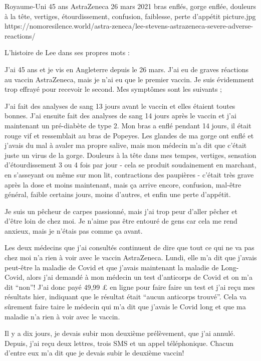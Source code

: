 {Royaume-Uni}
{45 ans}
{AstraZeneca}
{26 mars 2021}
{bras enflés, gorge enflée, douleurs à la tête, vertiges, étourdissement, confusion, faiblesse, perte d'appétit}
{picture.jpg}
{https://nomoresilence.world/astra-zeneca/lee-stevens-astrazeneca-severe-adverse-reactions/}
{

L'histoire de Lee dans ses propres mots :

J'ai 45 ans et je vis en Angleterre depuis le 26 mars. J'ai eu de graves
réactions au vaccin AstraZeneca, mais je n'ai eu que le premier vaccin. Je suis
évidemment trop effrayé pour recevoir le second. Mes symptômes sont les suivants
;

J'ai fait des analyses de sang 13 jours avant le vaccin et elles étaient toutes
bonnes. J'ai ensuite fait des analyses de sang 14 jours après le vaccin et j'ai
maintenant un pré-diabète de type 2. Mon bras a enflé pendant 14 jours, il était
rouge vif et ressemblait au bras de Popeyes. Les glandes de ma gorge ont enflé
et j'avais du mal à avaler ma propre salive, mais mon médecin m'a dit que
c'était juste un virus de la gorge. Douleurs à la tête dans mes tempes,
vertiges, sensation d'étourdissement 3 ou 4 fois par jour - cela se produit
soudainement en marchant, en s'asseyant ou même sur mon lit, contractions des
paupières - c'était très grave après la dose et moins maintenant, mais ça arrive
encore, confusion, mal-être général, faible certains jours, moins d'autres, et
enfin une perte d'appétit.

Je suis un pêcheur de carpes passionné, mais j'ai trop peur d'aller pêcher et
d'être loin de chez moi. Je n'aime pas être entouré de gens car cela me rend
anxieux, mais je n'étais pas comme ça avant.

Les deux médecins que j'ai consultés continuent de dire que tout ce qui ne va
pas chez moi n'a rien à voir avec le vaccin AstraZeneca. Lundi, elle m'a dit que
j'avais peut-être la maladie de Covid et que j'avais maintenant la maladie de
Long-Covid, alors j'ai demandé à mon médecin un test d'anticorps de Covid et on
m'a dit “non”! J'ai donc payé 49,99 £ en ligne pour faire faire un test et j'ai
reçu mes résultats hier, indiquant que le résultat était “aucun anticorps
trouvé”. Cela va sûrement faire taire le médecin qui m'a dit que j'avais le
Covid long et que ma maladie n'a rien à voir avec le vaccin.

Il y a dix jours, je devais subir mon deuxième prélèvement, que j'ai
annulé. Depuis, j'ai reçu deux lettres, trois SMS et un appel
téléphonique. Chacun d'entre eux m'a dit que je devais subir le deuxième vaccin!

}
